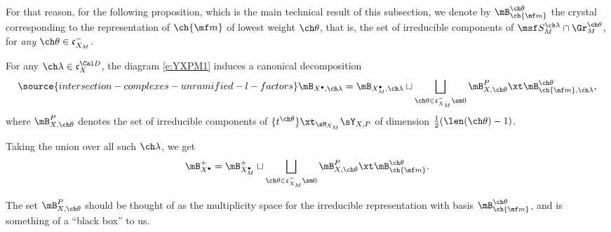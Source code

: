 For that reason, for the following proposition, which is the main technical result of this subsection, we denote by $\mB^{\ch\theta}_{\ch{\mf m}}$ the crystal corresponding to the representation of $\ch{\mf m}$ of lowest weight $\ch\theta$, that is, the set of irreducible components of $\msf S_M^{\ch\lambda} \cap \Gr_M^{\ch\theta} $, for \emph{any} $\ch\theta\in \mathfrak c_{X_M}^-$.

\begin{prop}
\notready\label{prop:crys-decomp}
For any $\ch\lambda\in \mathfrak c_X^{\Cal D}$, the diagram \eqref{e:YXPM1} induces a canonical decomposition
\begin{equation} \label{e:crys-decomp}
\source{intersection-complexes-unramified-l-factors}
    \mB_{X^\bullet,\ch\lambda} = \mB_{X_M^\bullet,\ch\lambda} \sqcup
        \bigsqcup_{\ch\theta \in \mathfrak c_{X_M}^-\sm 0}
        \mB^P_{X,\ch\theta} \xt \mB_{\ch{\mf m}, \ch\lambda}^{\ch\theta},
\end{equation}
where $\mB^P_{X,\ch\theta}$ denotes the set of irreducible components
of $\{t^{\ch\theta}\} \xt_{\sM_{X_M}} \sY_{X,P}$ of dimension $\frac 1 2 (\len(\ch\theta)-1)$.

Taking the union over all such $\ch\lambda$, we get
\begin{equation}
    \mB_{X^\bullet}^+ = \mB_{X_M^\bullet}^+ \sqcup \bigsqcup_{\ch\theta\in \mathfrak c_{X_M}^-\sm 0}
    \mB^P_{X,\ch\theta} \xt \mB^{\ch\theta}_{\ch{\mf m}}.
\end{equation}
\end{prop}

The set $\mB^P_{X,\ch\theta}$ should be thought of as the multiplicity space for the irreducible representation with basis $\mB^{\ch\theta}_{\ch{\mf m}}$, and is something of a ``black box'' to us.

